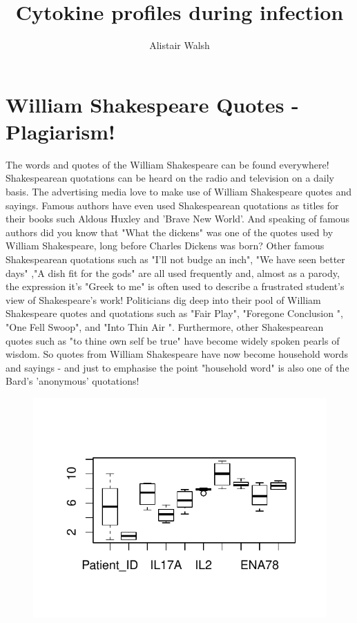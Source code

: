 \documentclass[12pt,a4paper,twocolumn]{article}
\author{Alistair Walsh}
\title{Cytokine profiles during infection}
\begin{document}
\maketitle


\section*{William Shakespeare Quotes - Plagiarism!}
The words and quotes of the William Shakespeare can be found everywhere! Shakespearean quotations can be heard on the radio and television on a daily basis. The advertising media love to make use of William Shakespeare quotes and sayings. Famous authors have even used Shakespearean quotations as titles for their books such Aldous Huxley and 'Brave New World'. And speaking of famous authors did you know that "What the dickens" was one of the quotes used by William Shakespeare, long before Charles Dickens was born? Other famous Shakespearean quotations such as "I'll not budge an inch", "We have seen better days" ,"A dish fit for the gods" are all used frequently and, almost as a parody, the expression it's "Greek to me" is often used to describe a frustrated student's view of Shakespeare's work! Politicians dig deep into their pool of William Shakespeare quotes and quotations such as "Fair Play", "Foregone Conclusion ", "One Fell Swoop", and "Into Thin Air ". Furthermore, other Shakespearean quotes such as "to thine own self be true" have become widely spoken pearls of wisdom. So quotes from William Shakespeare have now become household words and sayings - and just to emphasise the point "household word" is also one of the Bard's 'anonymous' quotations!







\begin{figure}[h]


\includegraphics{paper-002}
\end{figure}
\end{document}
